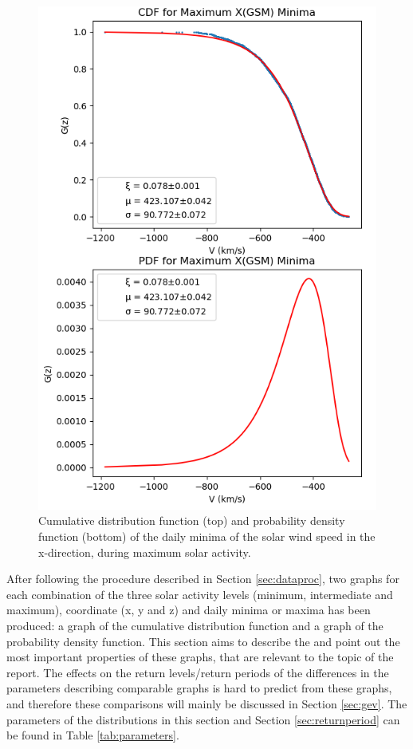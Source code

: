 \documentclass[12pt]{article}
\begin{document}
\begin{figure}[t!]
\begin{minipage}{0.48\textwidth}
                \includegraphics[width=\textwidth]{fig_method/SWEmaxXmin.png}
                \caption{Cumulative distribution function (top) and probability density function (bottom) of the daily minima of the solar wind speed in the x-direction, during maximum solar activity.}
                \label{fig:SWEmaxXmin}
            \end{minipage}
        \end{figure}
        After following the procedure described in Section \ref{sec:dataproc}, two graphs for each combination of the three solar activity levels (minimum, intermediate and maximum), coordinate (x, y and z) and daily minima or maxima has been produced: a graph of the cumulative distribution function and a graph of the probability density function. This section aims to describe the and point out the most important properties of these graphs, that are relevant to the topic of the report. The effects on the return levels/return periods of the differences in the parameters describing comparable graphs is hard to predict from these graphs, and therefore these comparisons will mainly be discussed in Section \ref{sec:gev}. The parameters of the distributions in this section and Section \ref{sec:returnperiod} can be found in Table \ref{tab:parameters}.\\
\end{document}

